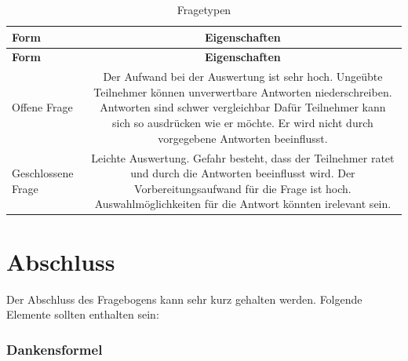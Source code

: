 \begin{longtable}[c]{@{}lc@{}}
\caption{Fragetypen}\tabularnewline
\toprule
\begin{minipage}[b]{0.24\columnwidth}\raggedright\strut
\textbf{Form}
\strut\end{minipage} &
\begin{minipage}[b]{0.70\columnwidth}\centering\strut
\textbf{Eigenschaften}
\strut\end{minipage}\tabularnewline
\midrule
\endfirsthead
\toprule
\begin{minipage}[b]{0.24\columnwidth}\raggedright\strut
\textbf{Form}
\strut\end{minipage} &
\begin{minipage}[b]{0.70\columnwidth}\centering\strut
\textbf{Eigenschaften}
\strut\end{minipage}\tabularnewline
\midrule
\endhead
\begin{minipage}[t]{0.24\columnwidth}\raggedright\strut
Offene Frage
\strut\end{minipage} &
\begin{minipage}[t]{0.70\columnwidth}\centering\strut
Der Aufwand bei der Auswertung ist sehr hoch. Ungeübte Teilnehmer können
unverwertbare Antworten niederschreiben. Antworten sind schwer
vergleichbar Dafür Teilnehmer kann sich so ausdrücken wie er möchte. Er
wird nicht durch vorgegebene Antworten beeinflusst.
\strut\end{minipage}\tabularnewline
\begin{minipage}[t]{0.24\columnwidth}\raggedright\strut
Geschlossene Frage
\strut\end{minipage} &
\begin{minipage}[t]{0.70\columnwidth}\centering\strut
Leichte Auswertung. Gefahr besteht, dass der Teilnehmer ratet und durch
die Antworten beeinflusst wird. Der Vorbereitungsaufwand für die Frage
ist hoch. Auswahlmöglichkeiten für die Antwort könnten irelevant sein.
\strut\end{minipage}\tabularnewline
\bottomrule
\end{longtable}

\section{Abschluss}\label{abschluss}

Der Abschluss des Fragebogens kann sehr kurz gehalten werden. Folgende
Elemente sollten enthalten sein:

\subsubsection{Dankensformel}\label{dankensformel}

